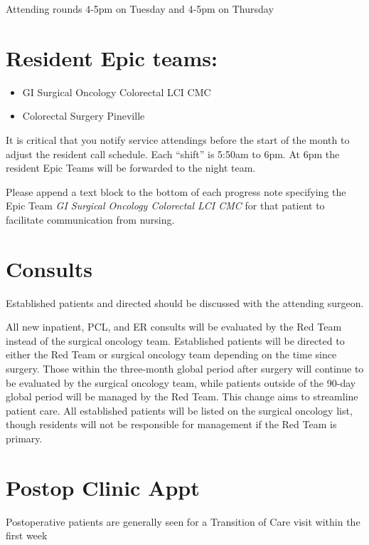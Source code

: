 \documentclass[
  letterpaper,
]{scrbook}
\providecommand{\tightlist}{%
  \setlength{\itemsep}{0pt}\setlength{\parskip}{0pt}}
\begin{document}
Attending rounds 4-5pm on Tuesday and 4-5pm on Thursday

\section{Resident Epic teams:}\label{resident-epic-teams}

\begin{itemize}
\tightlist
\item
  GI Surgical Oncology Colorectal LCI CMC
\item
  Colorectal Surgery Pineville
\end{itemize}

It is critical that you notify service attendings before the start of
the month to adjust the resident call schedule. Each ``shift'' is 5:50am
to 6pm. At 6pm the resident Epic Teams will be forwarded to the night
team.

Please append a text block to the bottom of each progress note
specifying the Epic Team \emph{GI Surgical Oncology Colorectal LCI CMC}
for that patient to facilitate communication from nursing.

\section{Consults}\label{consults}

Established patients and directed should be discussed with the attending
surgeon.

All new inpatient, PCL, and ER consults will be evaluated by the Red
Team instead of the surgical oncology team. Established patients will be
directed to either the Red Team or surgical oncology team depending on
the time since surgery. Those within the three-month global period after
surgery will continue to be evaluated by the surgical oncology team,
while patients outside of the 90-day global period will be managed by
the Red Team. This change aims to streamline patient care. All
established patients will be listed on the surgical oncology list,
though residents will not be responsible for management if the Red Team
is primary.

\section{Postop Clinic Appt}\label{postop-clinic-appt}

Postoperative patients are generally seen for a Transition of Care visit
within the first week
\end{document}
